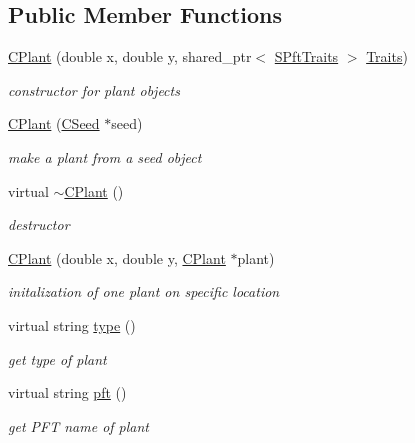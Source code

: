 \subsection*{Public Member Functions}
\begin{DoxyCompactItemize}
\item 
\mbox{\hyperlink{class_c_plant_a85565035b648d0771cb8344e018c362b}{C\+Plant}} (double x, double y, shared\+\_\+ptr$<$ \mbox{\hyperlink{class_s_pft_traits}{S\+Pft\+Traits}} $>$ \mbox{\hyperlink{class_c_plant_aab480753ce36094220b0c38fbc2b69eb}{Traits}})
\begin{DoxyCompactList}\small\item\em constructor for plant objects \end{DoxyCompactList}\item 
\mbox{\hyperlink{class_c_plant_a8942a3b196d81a7498b8bb4a40e57bfd}{C\+Plant}} (\mbox{\hyperlink{class_c_seed}{C\+Seed}} $\ast$seed)
\begin{DoxyCompactList}\small\item\em make a plant from a seed object \end{DoxyCompactList}\item 
virtual \mbox{\hyperlink{class_c_plant_ad52ea5533d1cefc5db609f1d2754f47f}{$\sim$\+C\+Plant}} ()
\begin{DoxyCompactList}\small\item\em destructor \end{DoxyCompactList}\item 
\mbox{\hyperlink{class_c_plant_ac539d50780b1d39e9426786f9b9917c2}{C\+Plant}} (double x, double y, \mbox{\hyperlink{class_c_plant}{C\+Plant}} $\ast$plant)
\begin{DoxyCompactList}\small\item\em initalization of one plant on specific location \end{DoxyCompactList}\item 
virtual string \mbox{\hyperlink{class_c_plant_a6f01bbbf4d15243a1e00e85ce1a9de5b}{type}} ()
\begin{DoxyCompactList}\small\item\em get type of plant \end{DoxyCompactList}\item 
virtual string \mbox{\hyperlink{class_c_plant_a911d2b301b01fc5a37945fbca57e96b3}{pft}} ()
\begin{DoxyCompactList}\small\item\em get P\+FT name of plant \end{DoxyCompactList}\item 

\end{DoxyCompactItemize}
